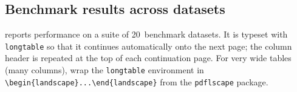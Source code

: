 \subsection{Benchmark results across datasets}

 reports performance on a suite of
\num{20}~benchmark datasets.
It is typeset with \texttt{longtable} so that it continues
automatically onto the next page; the column header is repeated
at the top of each continuation page.
For very wide tables (many columns), wrap the \texttt{longtable}
environment in \verb|\begin{landscape}...\end{landscape}| from
the \texttt{pdflscape} package.

